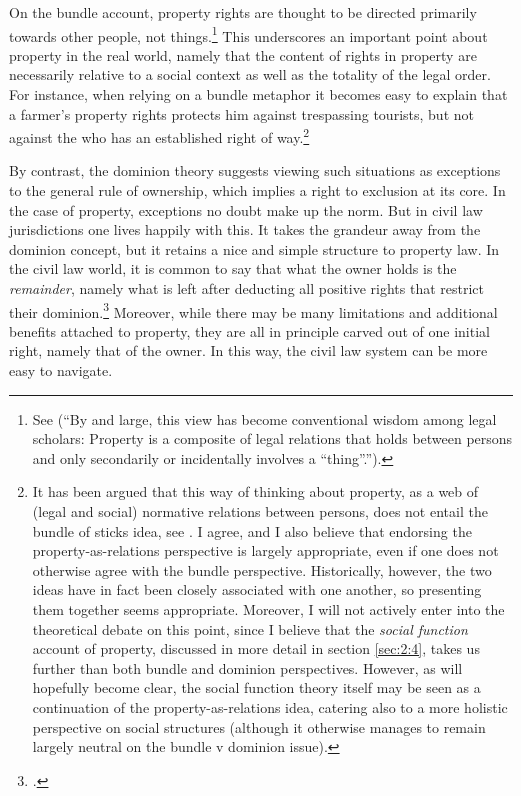 On the bundle account, property rights are thought to be directed primarily towards other people, not things.\footnote{See \cite[357-358]{merrill01} (``By and large, this view has become conventional wisdom among legal scholars: Property is a composite of legal relations that holds between persons and only secondarily or incidentally involves a ``thing''.'').} This underscores an important point about property in the real world, namely that the content of rights in property are necessarily relative to a social context as well as the totality of the legal order. For instance, when relying on a bundle metaphor it becomes easy to explain that a farmer's property rights protects him against trespassing tourists, but not against the  who has an established right of way.\footnote{It has been argued that this way of thinking about property, as a web of (legal and social) normative relations between persons, does not entail the bundle of sticks idea, see \cite[23-25]{dorfman10}. I agree, and I also believe that endorsing the property-as-relations perspective is largely appropriate, even if one does not otherwise agree with the bundle perspective. Historically, however, the two ideas have in fact been closely associated with one another, so presenting them together seems appropriate. Moreover, I will not actively enter into the theoretical debate on this point, since I believe that the {\it social function} account of property, discussed in more detail in section \ref{sec:2:4}, takes us further than both bundle and dominion perspectives. However, as will hopefully become clear, the social function theory itself may be seen as a continuation of the property-as-relations idea, catering also to a more holistic perspective on social structures (although it otherwise manages to remain largely neutral on the bundle v dominion issue).}

By contrast, the dominion theory suggests viewing such situations as exceptions to the general rule of ownership, which implies a right to exclusion at its core. In the case of property, exceptions no doubt make up the norm. But in civil law jurisdictions one lives happily with this. It takes the grandeur away from the dominion concept, but it retains a nice and simple structure to property law. In the civil law world, it is common to say that what the owner holds is the {\it remainder}, namely what is left after deducting all positive rights that restrict their dominion.\footcite[25]{chang12} Moreover, while there may be many limitations and additional benefits attached to property, they are all in principle carved out of one initial right, namely that of the owner. In this way, the civil law system can be more easy to navigate.


